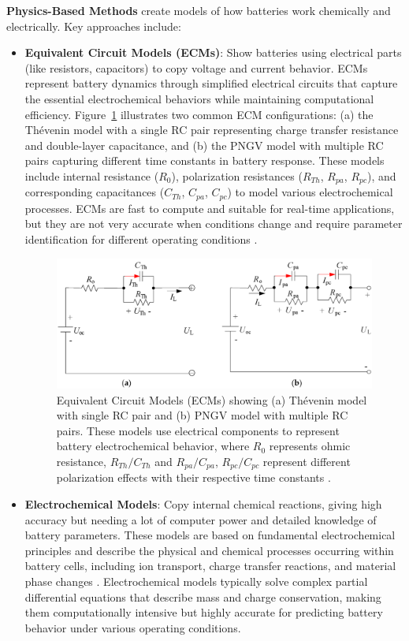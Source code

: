 \textbf{Physics-Based Methods} create models of how batteries work chemically and electrically. Key approaches include:
\begin{itemize}
    \item \textbf{Equivalent Circuit Models (ECMs)}: Show batteries using electrical parts (like resistors, capacitors) to copy voltage and current behavior. ECMs represent battery dynamics through simplified electrical circuits that capture the essential electrochemical behaviors while maintaining computational efficiency. Figure~\ref{fig:ecm_models} illustrates two common ECM configurations: (a) the Thévenin model with a single RC pair representing charge transfer resistance and double-layer capacitance, and (b) the PNGV model with multiple RC pairs capturing different time constants in battery response. These models include internal resistance ($R_0$), polarization resistances ($R_{Th}$, $R_{pa}$, $R_{pc}$), and corresponding capacitances ($C_{Th}$, $C_{pa}$, $C_{pc}$) to model various electrochemical processes. ECMs are fast to compute and suitable for real-time applications, but they are not very accurate when conditions change and require parameter identification for different operating conditions \cite{tran_comparative_2021}.
    \label{subsec:ecm_models}

\begin{figure}[htbp]
\centering
\includegraphics[width=1.0\textwidth]{imgs/ECM_1st_2nd_order.png}
\caption{Equivalent Circuit Models (ECMs) showing (a) Thévenin model with single RC pair and (b) PNGV model with multiple RC pairs. These models use electrical components to represent battery electrochemical behavior, where $R_0$ represents ohmic resistance, $R_{Th}/C_{Th}$ and $R_{pa}/C_{pa}$, $R_{pc}/C_{pc}$ represent different polarization effects with their respective time constants \cite{tran_comparative_2021}.}
\label{fig:ecm_models}
\end{figure}

    \item \textbf{Electrochemical Models}: Copy internal chemical reactions, giving high accuracy but needing a lot of computer power and detailed knowledge of battery parameters. These models are based on fundamental electrochemical principles and describe the physical and chemical processes occurring within battery cells, including ion transport, charge transfer reactions, and material phase changes \cite{mama_comprehensive_2025}. Electrochemical models typically solve complex partial differential equations that describe mass and charge conservation, making them computationally intensive but highly accurate for predicting battery behavior under various operating conditions.


\end{itemize}
